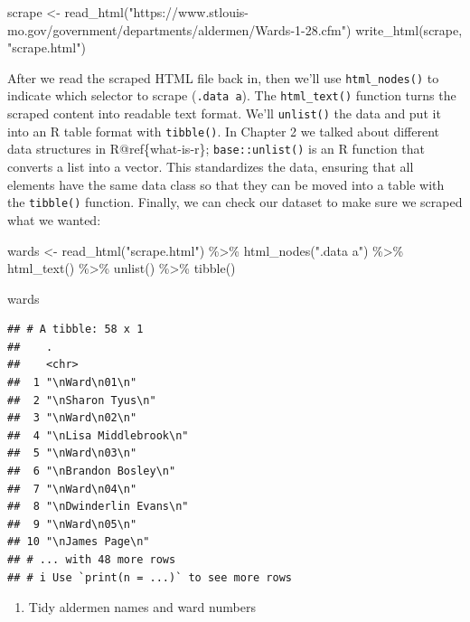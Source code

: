 \documentclass[
  krantz2]{krantz}
\makeatletter
\newenvironment{Shaded}{\begin{snugshade}}{\end{snugshade}}
\newcommand{\FunctionTok}[1]{\textcolor[rgb]{0,0,0}{#1}}
\newcommand{\NormalTok}[1]{#1}
\newcommand{\OtherTok}[1]{\textcolor[rgb]{0.37,0.37,0.37}{#1}}
\newcommand{\SpecialCharTok}[1]{\textcolor[rgb]{0,0,0}{#1}}
\newcommand{\StringTok}[1]{\textcolor[rgb]{0.5,0.5,0.5}{#1}}
\providecommand{\tightlist}{%
  \setlength{\itemsep}{0pt}\setlength{\parskip}{0pt}}
\newenvironment{kframe}{%
\medskip{}
\setlength{\fboxsep}{.8em}
 \def\at@end@of@kframe{}%
 \ifinner\ifhmode%
  \def\at@end@of@kframe{\end{minipage}}%
  \begin{minipage}{\columnwidth}%
 \fi\fi%
 \def\FrameCommand##1{\hskip\@totalleftmargin \hskip-\fboxsep
 \colorbox{shadecolor}{##1}\hskip-\fboxsep
     \hskip-\linewidth \hskip-\@totalleftmargin \hskip\columnwidth}%
 \MakeFramed {\advance\hsize-\width
   \@totalleftmargin\z@ \linewidth\hsize
   \@setminipage}}%
 {\par\unskip\endMakeFramed%
 \at@end@of@kframe}
\renewenvironment{Shaded}{\begin{kframe}}{\end{kframe}}
\makeatother
\begin{document}
\begin{Shaded}
\begin{Highlighting}[]
\NormalTok{scrape }\OtherTok{\textless{}{-}} \FunctionTok{read\_html}\NormalTok{(}\StringTok{"https://www.stlouis{-}mo.gov/government/departments/aldermen/Wards{-}1{-}28.cfm"}\NormalTok{)}
\FunctionTok{write\_html}\NormalTok{(scrape, }\StringTok{"scrape.html"}\NormalTok{)}
\end{Highlighting}
\end{Shaded}

After we read the scraped HTML file back in, then we'll use \texttt{html\_nodes()} to indicate which selector to scrape (\texttt{.data\ a}). The \texttt{html\_text()} function turns the scraped content into readable text format. We'll \texttt{unlist()} the data and put it into an R table format with \texttt{tibble()}. In Chapter 2 we talked about different data structures in R@ref\{what-is-r\}; \texttt{base::unlist()} is an R function that converts a list into a vector. This standardizes the data, ensuring that all elements have the same data class so that they can be moved into a table with the \texttt{tibble()} function. Finally, we can check our dataset to make sure we scraped what we wanted:

\begin{Shaded}
\begin{Highlighting}[]
\NormalTok{wards }\OtherTok{\textless{}{-}} \FunctionTok{read\_html}\NormalTok{(}\StringTok{"scrape.html"}\NormalTok{) }\SpecialCharTok{\%\textgreater{}\%}
  \FunctionTok{html\_nodes}\NormalTok{(}\StringTok{".data a"}\NormalTok{) }\SpecialCharTok{\%\textgreater{}\%}
  \FunctionTok{html\_text}\NormalTok{() }\SpecialCharTok{\%\textgreater{}\%}
  \FunctionTok{unlist}\NormalTok{() }\SpecialCharTok{\%\textgreater{}\%}
  \FunctionTok{tibble}\NormalTok{()}

\NormalTok{wards}
\end{Highlighting}
\end{Shaded}

\begin{verbatim}
## # A tibble: 58 x 1
##    .
##    <chr>
##  1 "\nWard\n01\n"
##  2 "\nSharon Tyus\n"
##  3 "\nWard\n02\n"
##  4 "\nLisa Middlebrook\n"
##  5 "\nWard\n03\n"
##  6 "\nBrandon Bosley\n"
##  7 "\nWard\n04\n"
##  8 "\nDwinderlin Evans\n"
##  9 "\nWard\n05\n"
## 10 "\nJames Page\n"
## # ... with 48 more rows
## # i Use `print(n = ...)` to see more rows
\end{verbatim}

\begin{enumerate}
\def\labelenumi{\arabic{enumi}.}
\setcounter{enumi}{1}
\tightlist
\item
  Tidy aldermen names and ward numbers
\end{enumerate}
\end{document}
